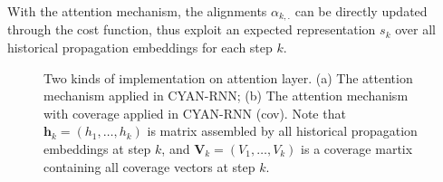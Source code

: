 With the attention mechanism, the alignments $\alpha_{k,.}$ can be directly
updated through the cost function, thus exploit an expected representation
$s_k$ over all historical propagation embeddings for each step $k$.


 
\begin{figure}[ht!]
\centering
{}
\caption{Two kinds of implementation on attention layer. (a) The attention
mechanism applied in CYAN-RNN; (b) The attention mechanism with coverage applied
in CYAN-RNN (cov). Note that $\textbf{h}_k=(h_1,\ldots,h_k)$ is matrix assembled by all
historical propagation embeddings at step $k$, and
$\textbf{V}_k=(V_1,\ldots,V_k)$ is a coverage martix containing all coverage
vectors at step $k$.}
\end{figure}

